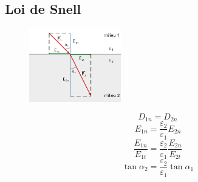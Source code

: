 \documentclass[resume]{subfiles}
\begin{document}
\subsection{Loi de Snell}
\begin{figure}[H]
\centering
\includegraphics[width=4.00cm]{img_0.png}
\end{figure}
$$D_{1n}=D_{2n}$$
$$E_{1n}=\frac{\varepsilon_2}{\varepsilon_1}E_{2n}$$
$$\frac{E_{1n}}{E_{1t}}=\frac{\varepsilon_2}{\varepsilon_1}\frac{E_{2n}}{E_{2t}}$$
$$\tan\alpha_2=\frac{\varepsilon_2}{\varepsilon_1}\tan\alpha_1$$
\end{document}

